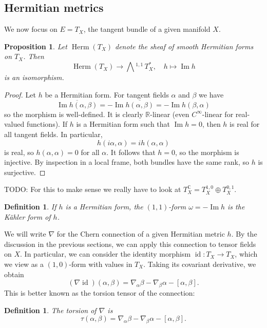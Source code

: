 \documentclass[11pt]{article}
\newtheorem{prop}[theo]{Proposition}
\newtheorem{defi}[theo]{Definition}
\newtheorem*{proof}{Proof}
\newcommand{\kk}[1]{\mathbb{#1}}
\DeclareMathOperator{\im}{Im}
\DeclareMathOperator{\id}{id}
\newcommand{\ext}[1]{\bigwedge{}^{\!\!#1}\,}
\begin{document}
\subsection{Hermitian metrics}

We now focus on $E = T_X$, the tangent bundle of a given manifold $X$.


\begin{prop}
Let $\operatorname{Herm}(T_X)$ denote the sheaf of smooth Hermitian forms on $T_X$. Then
$$
\operatorname{Herm}(T_X) \to \ext{1,1} T_X^*,
\quad
h \mapsto \im h
$$
is an isomorphism.
\end{prop}

\begin{proof}
Let $h$ be a Hermitian form. For tangent fields $\alpha$ and $\beta$ we have
$$
\overline{\im h(\alpha,\beta)}
= -\im \overline{h(\alpha, \beta)}
= -\im h(\beta, \alpha)
$$
so the morphism is well-defined. It is clearly $\kk R$-linear (even $C^\infty$-linear for real-valued functions). If $h$ is a Hermitian form such that $\im h = 0$, then $h$ is real for all tangent fields. In particular,
$$
h(i\alpha, \alpha) = i h(\alpha,\alpha)
$$
is real, so $h(\alpha,\alpha) = 0$ for all $\alpha$. It follows that $h = 0$, so the morphism is injective. By inspection in a local frame, both bundles have the same rank, so $h$ is surjective.
\end{proof}

TODO: For this to make sense we really have to look at $T_X^{\kk C} = T_X^{1,0} \oplus T_X^{0,1}$.

\begin{defi}
If $h$ is a Hermitian form, the $(1,1)$-form $\omega = -\im h$ is the \emph{K\"ahler form} of $h$.
\end{defi}


We will write $\nabla$ for the Chern connection of a given Hermitian metric $h$. By the discussion in the previous sections, we can apply this connection to tensor fields on $X$. In particular, we can consider the identity morphism $\id : T_X \to T_X$, which we view as a $(1,0)$-form with values in $T_X$. Taking its covariant derivative, we obtain
$$
(\nabla \id)(\alpha, \beta)
= \nabla_\alpha \beta - \nabla_\beta \alpha - [\alpha, \beta].
$$
This is better known as the torsion tensor of the connection:

\begin{defi}
The \emph{torsion} of $\nabla$ is
$$
\tau(\alpha,\beta)
= \nabla_\alpha \beta - \nabla_\beta \alpha - [\alpha, \beta].
$$
\end{defi}
\end{document}

